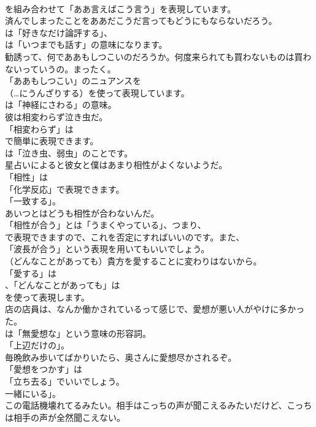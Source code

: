\documentclass[8pt]{extreport}
\begin{document}
\begin{CJK}{UTF8}{min}
\\	を組み合わせて「ああ言えばこう言う」を表現しています。	
\\	済んでしまったことをああだこうだ言ってもどうにもならないだろう。 
\\	は「好きなだけ論評する」、
\\	は「いつまでも話す」の意味になります。	
\\	勧誘って、何でああもしつこいのだろうか。何度来られても買わないものは買わないっていうの。まったく。 
\\	「ああもしつこい」のニュアンスを 
\\	（…にうんざりする）を使って表現しています。
\\	は「神経にさわる」の意味。	
\\	彼は相変わらず泣き虫だ。 
\\	「相変わらず」は
\\	で簡単に表現できます。
\\	は「泣き虫、弱虫」のことです。	
\\	星占いによると彼女と僕はあまり相性がよくないようだ。 
\\	「相性」は
\\	「化学反応」で表現できます。
\\	「一致する」。	
\\	あいつとはどうも相性が合わないんだ。 
\\	「相性が合う」とは「うまくやっている」、つまり、
\\	で表現できますので、これを否定にすればいいのです。また、
\\	「波長が合う」という表現を用いてもいいでしょう。	
\\	（どんなことがあっても）貴方を愛することに変わりはないから。 
\\	「愛する」は
\\	、「どんなことがあっても」は
\\	を使って表現します。	
\\	店の店員は、なんか働かされているって感じで、愛想が悪い人がやけに多かった。 
\\	は「無愛想な」という意味の形容詞。
\\	「上辺だけの」。	
\\	毎晩飲み歩いてばかりいたら、奥さんに愛想尽かされるぞ。 
\\	「愛想をつかす」は
\\	「立ち去る」でいいでしょう。
\\	一緒にいる」。	
\\	この電話機壊れてるみたい。相手はこっちの声が聞こえるみたいだけど、こっちは相手の声が全然聞こえない。 

\end{CJK}
\end{document}
